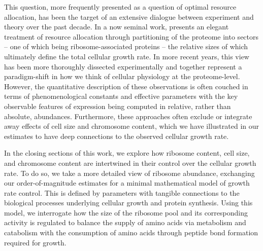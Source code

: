 This question, more frequently presented as a question of optimal resource
allocation, has been the target of an extensive dialogue between experiment and
theory over the past decade. In a now seminal work,
\cite{scott2010} presents an elegant treatment of resource allocation through
partitioning of the proteome into sectors -- one of which being
ribosome-associated proteins -- the relative sizes of which ultimately define
the total cellular growth rate. In more recent years, this view has been more
thoroughly dissected experimentally
\citep{klumpp2014,basan2015,dai2018, dai2016, erickson2017} and together
represent a paradigm-shift in how we think of cellular physiology at the
proteome-level. However, the quantitative description of these  observations is
often couched in terms of phenomenological constants and effective parameters
with the key observable features of expression being computed in relative, rather
than absolute, abundances. Furthermore, these approaches often exclude or
integrate away effects of cell size and chromosome content, which we have
illustrated in our estimates to have deep connections to the observed cellular
growth rate.

In the closing sections of this work, we explore how ribosome content, cell
size, and chromosome content are intertwined in their control over the cellular
growth rate. To do so, we take a more detailed view of ribosome abundance,
exchanging our order-of-magnitude estimates for a minimal mathematical model of
growth rate control. This is defined by parameters with tangible connections to
the biological processes underlying cellular growth and protein synthesis. Using
this model, we interrogate how the size of the ribosome pool and its
corresponding activity is regulated to balance the supply of amino acids via
metabolism and catabolism with the consumption of amino acids through peptide
bond formation required for growth.

